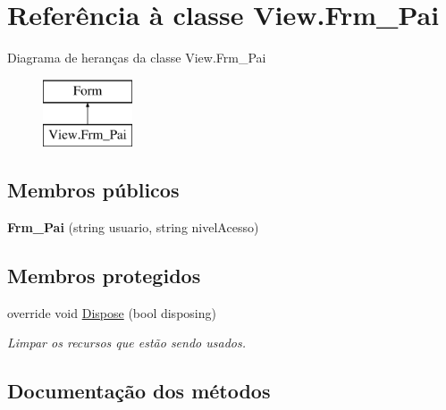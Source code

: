 \hypertarget{class_view_1_1_frm___pai}{}\section{Referência à classe View.\+Frm\+\_\+\+Pai}
\label{class_view_1_1_frm___pai}
Diagrama de heranças da classe View.\+Frm\+\_\+\+Pai\begin{figure}[H]
\begin{center}
\leavevmode
\includegraphics[height=2.000000cm]{class_view_1_1_frm___pai}
\end{center}
\end{figure}
\subsection*{Membros públicos}
\begin{DoxyCompactItemize}
\item 
\hypertarget{class_view_1_1_frm___pai_afc7f379d276cbd7eda18807237ca2168}{}{\bfseries Frm\+\_\+\+Pai} (string usuario, string nivel\+Acesso)\label{class_view_1_1_frm___pai_afc7f379d276cbd7eda18807237ca2168}

\end{DoxyCompactItemize}
\subsection*{Membros protegidos}
\begin{DoxyCompactItemize}
\item 
override void \hyperlink{class_view_1_1_frm___pai_a690f74bbe1f715ef71a1e3605d26a0fc}{Dispose} (bool disposing)
\begin{DoxyCompactList}\small\item\em Limpar os recursos que estão sendo usados. \end{DoxyCompactList}\end{DoxyCompactItemize}


\subsection{Documentação dos métodos}
\hypertarget{class_view_1_1_frm___pai_a690f74bbe1f715ef71a1e3605d26a0fc}{}
